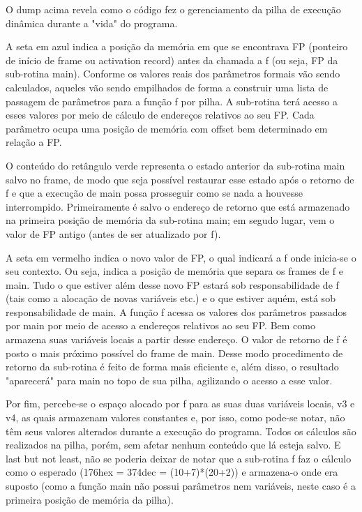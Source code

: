 \documentclass[a4paper,12pt]{report}
\begin{document}
    O dump acima revela como o código fez o gerenciamento da pilha de execução dinâmica durante a "vida" do programa.

    A seta em azul indica a posição da memória em que se encontrava FP (ponteiro de início de frame ou activation record) antes da chamada a f (ou seja, FP da sub-rotina main).
    Conforme os valores reais dos parâmetros formais vão sendo calculados, aqueles vão sendo empilhados de forma a construir uma lista de passagem de parâmetros para a função f por pilha. A sub-rotina terá acesso a esses valores por meio de cálculo de endereços relativos ao seu FP. Cada parâmetro ocupa uma posição de memória com offset bem determinado em relação a FP.

    O conteúdo do retângulo verde representa o estado anterior da sub-rotina main salvo no frame, de modo que seja possível restaurar esse estado após o retorno de f e que a execução de main possa prosseguir como se nada a houvesse interrompido. Primeiramente é salvo o endereço de retorno que está armazenado na primeira posição de memória da sub-rotina main; em segudo lugar, vem o valor de FP antigo (antes de ser atualizado por f).

    A seta em vermelho indica o novo valor de FP, o qual indicará a f onde inicia-se o seu contexto. Ou seja, indica a posição de memória que separa os frames de f e main. Tudo o que estiver além desse novo FP estará sob responsabilidade de f (tais como a alocação de novas variáveis etc.) e o que estiver aquém, está sob responsabilidade de main. A função f acessa os valores dos parâmetros passados por main por meio de acesso a endereços relativos ao seu FP. Bem como armazena suas variáveis locais a partir desse endereço. O valor de retorno de f é posto o mais próximo possível do frame de main. Desse modo procedimento de retorno da sub-rotina é feito de forma mais eficiente e, além disso, o resultado "aparecerá" para main no topo de sua pilha, agilizando o acesso a esse valor.

    Por fim, percebe-se o espaço alocado por f para as suas duas variáveis locais, v3 e v4, as quais armazenam valores constantes e, por isso, como pode-se notar, não têm seus valores alterados durante a execução do programa. Todos os cálculos  são realizados na pilha, porém, sem afetar nenhum conteúdo que lá esteja salvo.
    E last but not least, não se poderia deixar de notar que a sub-rotina f faz o cálculo como o esperado (176hex = 374dec = (10+7)*(20+2)) e armazena-o onde era suposto (como a função main não possui parâmetros nem variáveis, neste caso é a primeira posição de memória da pilha). 
\end{document}
